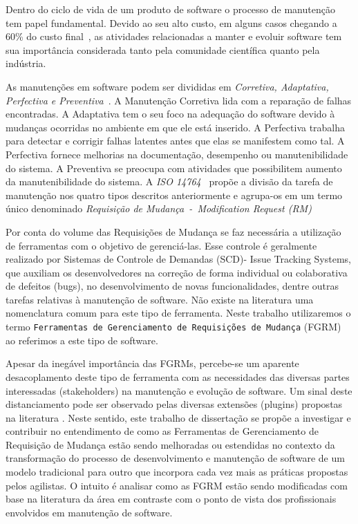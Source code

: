 Dentro do ciclo de vida de um produto de software o processo de manutenção tem
papel fundamental. Devido ao seu alto custo, em alguns casos chegando a 60\%
do custo final~\cite{kaur2015review}, as atividades relacionadas a manter e
evoluir software tem sua importância considerada tanto pela comunidade
científica quanto pela indústria.

As manutenções em software podem ser divididas em \textit{Corretiva, Adaptativa,
Perfectiva e Preventiva}~\cite{Lientz:1980:SMM:601062,159342}. A Manutenção
Corretiva lida com a reparação de falhas encontradas. A Adaptativa tem o seu
foco na adequação do software devido à mudanças ocorridas no ambiente em que ele
está inserido. A Perfectiva trabalha para detectar e corrigir falhas latentes
antes que elas se manifestem como tal. A  Perfectiva fornece melhorias na
documentação, desempenho ou manutenibilidade do sistema. A Preventiva se
preocupa com atividades que possibilitem aumento da manutenibilidade do sistema.
A \textit{ISO 14764}~\cite{1703974} propõe a divisão da tarefa de manutenção nos
quatro tipos descritos anteriormente e agrupa-os em um termo único denominado
\textit{Requisição de Mudança~-~Modification Request (RM)}

Por conta do volume das Requisições de Mudança se faz necessária a utilização de
ferramentas com o objetivo de gerenciá-las. Esse controle é geralmente realizado
por Sistemas de Controle de Demandas (SCD)- Issue Tracking Systems, que auxiliam
os desenvolvedores na correção de forma individual ou colaborativa de defeitos
(bugs), no desenvolvimento de novas funcionalidades, dentre outras tarefas
relativas à manutenção de software. Não existe na literatura uma nomenclatura
comum para este tipo de ferramenta. Neste trabalho utilizaremos o termo
\texttt{Ferramentas de Gerenciamento de Requisições de Mudança} (FGRM) ao
referimos a este tipo de software.

Apesar da inegável importância das FGRMs, percebe-se um aparente desacoplamento 
deste tipo de ferramenta com as necessidades das diversas partes interessadas
(stakeholders) na manutenção e evolução de software. Um sinal deste
distanciamento pode ser observado pelas diversas extensões (plugins) propostas
na literatura
\cite{101186,Thung:2014:BIT:2635868.2661678,Kononenko:2014:DED:2591062.2591075}.
Neste sentido, este trabalho de dissertação se propõe a investigar e contribuir
no entendimento de como as Ferramentas de Gerenciamento de Requisição de Mudança
estão sendo melhoradas ou estendidas no contexto da transformação do processo de
desenvolvimento e manutenção de software de um modelo tradicional para outro que
incorpora cada vez mais as práticas propostas pelos agilistas. O intuito é
analisar como as FGRM estão sendo modificadas com base na literatura da área em
contraste com o ponto de vista dos profissionais envolvidos em manutenção de
software.

